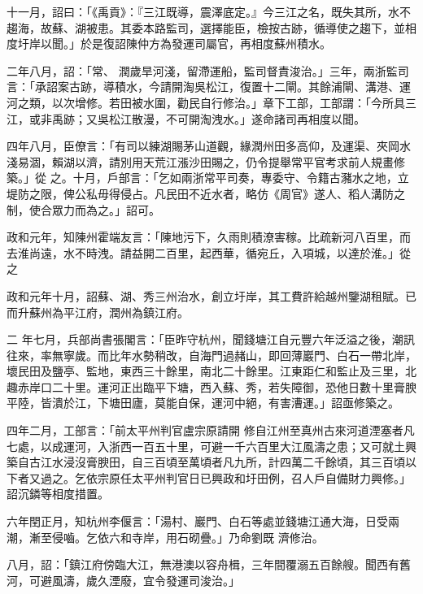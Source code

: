 \begin{pinyinscope}
 十一月，詔曰：「《禹貢》：『三江既導，震澤底定。』今三江之名，既失其所，水不趨海，故蘇、湖被患。其委本路監司，選擇能臣，檢按古跡，循導使之趨下，並相度圩岸以聞。」於是復詔陳仲方為發運司屬官，再相度蘇州積水。



 二年八月，詔：「常、
 潤歲旱河淺，留滯運船，監司督責浚治。」三年，兩浙監司言：「承詔案古跡，導積水，今請開淘吳松江，復置十二閘。其餘浦閘、溝港、運河之類，以次增修。若田被水圍，勸民自行修治。」章下工部，工部謂：「今所具三江，或非禹跡；又吳松江散漫，不可開淘洩水。」遂命諸司再相度以聞。



 四年八月，臣僚言：「有司以練湖賜茅山道觀，緣潤州田多高仰，及運渠、夾岡水淺易涸，賴湖以濟，請別用天荒江漲沙田賜之，仍令提舉常平官考求前人規畫修築。」從
 之。十月，戶部言：「乞如兩浙常平司奏，專委守、令籍古瀦水之地，立堤防之限，俾公私毋得侵占。凡民田不近水者，略仿《周官》遂人、稻人溝防之制，使合眾力而為之。」詔可。



 政和元年，知陳州霍端友言：「陳地污下，久雨則積潦害稼。比疏新河八百里，而去淮尚遠，水不時洩。請益開二百里，起西華，循宛丘，入項城，以達於淮。」從之



 政和元年十月，詔蘇、湖、秀三州治水，創立圩岸，其工費許給越州鑒湖租賦。已而升蘇州為平江府，潤州為鎮江府。



 二
 年七月，兵部尚書張閣言：「臣昨守杭州，聞錢塘江自元豐六年泛溢之後，潮訊往來，率無寧歲。而比年水勢稍改，自海門過赭山，即回薄巖門、白石一帶北岸，壞民田及鹽亭、監地，東西三十餘里，南北二十餘里。江東距仁和監止及三里，北趣赤岸口二十里。運河正出臨平下塘，西入蘇、秀，若失障御，恐他日數十里膏腴平陸，皆潰於江，下塘田廬，莫能自保，運河中絕，有害漕運。」詔亟修築之。



 四年二月，工部言：「前太平州判官盧宗原請開
 修自江州至真州古來河道湮塞者凡七處，以成運河，入浙西一百五十里，可避一千六百里大江風濤之患；又可就土興築自古江水浸沒膏腴田，自三百頃至萬頃者凡九所，計四萬二千餘頃，其三百頃以下者又過之。乞依宗原任太平州判官日已興政和圩田例，召人戶自備財力興修。」詔沉鏻等相度措置。



 六年閏正月，知杭州李偃言：「湯村、巖門、白石等處並錢塘江通大海，日受兩潮，漸至侵嚙。乞依六和寺岸，用石砌疊。」乃命劉既
 濟修治。



 八月，詔：「鎮江府傍臨大江，無港澳以容舟楫，三年間覆溺五百餘艘。聞西有舊河，可避風濤，歲久湮廢，宜令發運司浚治。」




\end{pinyinscope}
